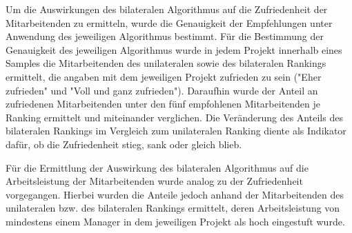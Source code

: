 Um die Auswirkungen des bilateralen Algorithmus auf die Zufriedenheit der Mitarbeitenden zu ermitteln, wurde die Genauigkeit der Empfehlungen unter Anwendung des jeweiligen Algorithmus bestimmt.
Für die Bestimmung der Genauigkeit des jeweiligen Algorithmus wurde in jedem Projekt innerhalb eines Samples die Mitarbeitenden des unilateralen sowie des bilateralen Rankings ermittelt, die angaben mit dem jeweiligen Projekt zufrieden zu sein ("Eher zufrieden" und "Voll und ganz zufrieden").
Daraufhin wurde der Anteil an zufriedenen Mitarbeitenden unter den fünf empfohlenen Mitarbeitenden je Ranking ermittelt und miteinander verglichen.
Die Veränderung des Anteils des bilateralen Rankings im Vergleich zum unilateralen Ranking diente als Indikator dafür, ob die Zufriedenheit stieg, sank oder gleich blieb.

Für die Ermittlung der Auswirkung des bilateralen Algorithmus auf die Arbeitsleistung der Mitarbeitenden wurde analog zu der Zufriedenheit vorgegangen.
Hierbei wurden die Anteile jedoch anhand der Mitarbeitenden des unilateralen bzw. des bilateralen Rankings ermittelt, deren Arbeitsleistung von mindestens einem Manager in dem jeweiligen Projekt als hoch eingestuft wurde.



